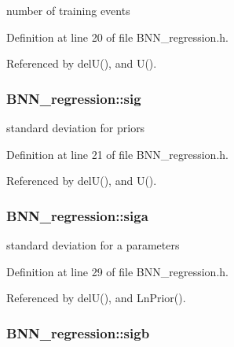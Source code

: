 number of training events 



Definition at line 20 of file B\-N\-N\-\_\-regression.\-h.



Referenced by del\-U(), and U().

\hypertarget{class_b_n_n__regression_a9f95130775752bea784e043d832945c1}{
\subsubsection[{sig}]{ B\-N\-N\-\_\-regression\-::sig\hspace{0.3cm}{\ttfamily [private]}}}\label{class_b_n_n__regression_a9f95130775752bea784e043d832945c1}


standard deviation for priors 



Definition at line 21 of file B\-N\-N\-\_\-regression.\-h.



Referenced by del\-U(), and U().

\hypertarget{class_b_n_n__regression_a608b84f81e365e0fd18662583982bc1f}{
\subsubsection[{siga}]{ B\-N\-N\-\_\-regression\-::siga\hspace{0.3cm}{\ttfamily [private]}}}\label{class_b_n_n__regression_a608b84f81e365e0fd18662583982bc1f}


standard deviation for a parameters 



Definition at line 29 of file B\-N\-N\-\_\-regression.\-h.



Referenced by del\-U(), and Ln\-Prior().

\hypertarget{class_b_n_n__regression_a6c793005c574b73cfe7d0e1776c21c52}{
\subsubsection[{sigb}]{ B\-N\-N\-\_\-regression\-::sigb\hspace{0.3cm}{\ttfamily [private]}}}\label{class_b_n_n__regression_a6c793005c574b73cfe7d0e1776c21c52}


